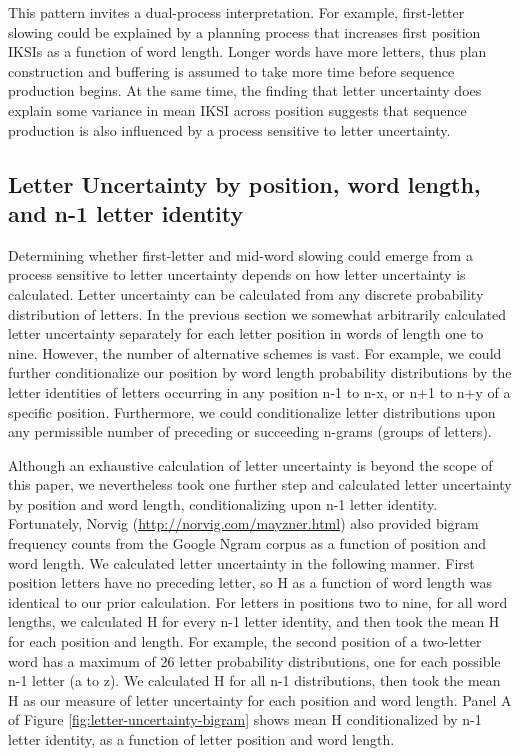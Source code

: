 \documentclass[floatsintext,man]{apa6}
\theoremstyle{definition}
\theoremstyle{definition}
\theoremstyle{definition}
\theoremstyle{remark}
\begin{document}
This pattern invites a dual-process interpretation. For example,
first-letter slowing could be explained by a planning process that
increases first position IKSIs as a function of word length. Longer
words have more letters, thus plan construction and buffering is assumed
to take more time before sequence production begins. At the same time,
the finding that letter uncertainty does explain some variance in mean
IKSI across position suggests that sequence production is also
influenced by a process sensitive to letter uncertainty.

\subsection{Letter Uncertainty by position, word length, and n-1 letter
identity}\label{letter-uncertainty-by-position-word-length-and-n-1-letter-identity}

Determining whether first-letter and mid-word slowing could emerge from
a process sensitive to letter uncertainty depends on how letter
uncertainty is calculated. Letter uncertainty can be calculated from any
discrete probability distribution of letters. In the previous section we
somewhat arbitrarily calculated letter uncertainty separately for each
letter position in words of length one to nine. However, the number of
alternative schemes is vast. For example, we could further
conditionalize our position by word length probability distributions by
the letter identities of letters occurring in any position n-1 to n-x,
or n+1 to n+y of a specific position. Furthermore, we could
conditionalize letter distributions upon any permissible number of
preceding or succeeding n-grams (groups of letters).

Although an exhaustive calculation of letter uncertainty is beyond the
scope of this paper, we nevertheless took one further step and
calculated letter uncertainty by position and word length,
conditionalizing upon n-1 letter identity. Fortunately, Norvig
(\url{http://norvig.com/mayzner.html}) also provided bigram frequency
counts from the Google Ngram corpus as a function of position and word
length. We calculated letter uncertainty in the following manner. First
position letters have no preceding letter, so H as a function of word
length was identical to our prior calculation. For letters in positions
two to nine, for all word lengths, we calculated H for every n-1 letter
identity, and then took the mean H for each position and length. For
example, the second position of a two-letter word has a maximum of 26
letter probability distributions, one for each possible n-1 letter (a to
z). We calculated H for all n-1 distributions, then took the mean H as
our measure of letter uncertainty for each position and word length.
Panel A of Figure \ref{fig:letter-uncertainty-bigram} shows mean H
conditionalized by n-1 letter identity, as a function of letter position
and word length.
\end{document}
